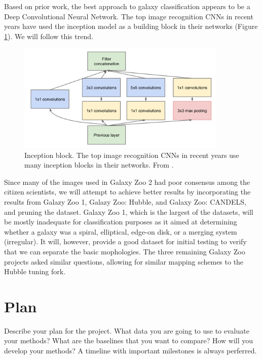 \documentclass{article}
\begin{document}
Based on prior work, the best approach to galaxy classification appears to be a Deep Convolutional Neural Network. The top image recognition CNNs in recent years have used the inception model \citep{2014arXiv1409.4842S} as a building block in their networks (Figure \ref{fig:inception}). We will follow this trend.

\begin{figure}[h]
  \centering
	\includegraphics[width=100mm]{../img/inception.png}
  \caption{Inception block. The top image recognition CNNs in recent years use many inception blocks in their networks. From \cite{2014arXiv1409.4842S}.}
  \label{fig:inception}
\end{figure}

Since many of the images used in Galaxy Zoo 2 had poor consensus among the citizen scientists, we will attempt to achieve better results by incorporating the results from Galazy Zoo 1, Galazy Zoo: Hubble, and Galaxy Zoo: CANDELS, and pruning the dataset. Galaxy Zoo 1, which is the largest of the datasets, will be mostly inadequate for classification purposes as it aimed at determining whether a galaxy was a spiral, elliptical, edge-on disk, or a merging system (irregular). It will, however, provide a good dataset for initial testing to verify that we can separate the basic mophologies. The three remaining Galaxy Zoo projects asked similar questions, allowing for similar mapping schemes to the Hubble tuning fork.



\section{Plan}
Describe your plan for the project. What data you are going to use to evaluate your methods? What are the baselines that you want to compare? How will you develop your methods?   A timeline with important milestones is always perferred.

\end{document}
